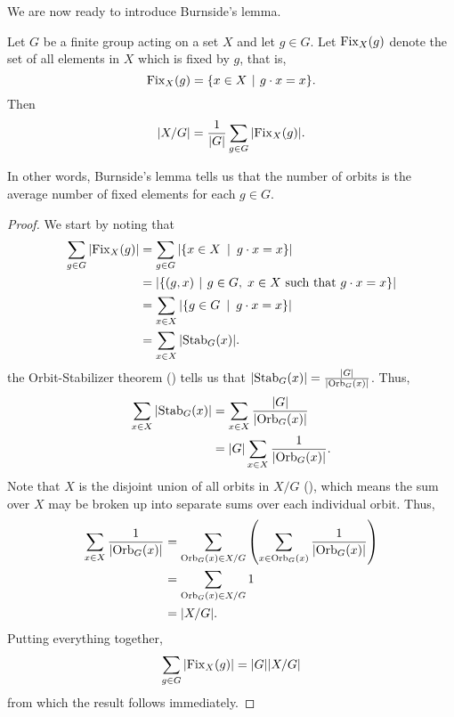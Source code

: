We are now ready to introduce Burnside's lemma.
\begin{lemma}[Burnside]\label{lemma-burnside}
    Let $G$ be a finite group acting on a set $X$ and let $g \in G$. Let $\mathrm{Fix}_{X}(g)$ denote the set of all elements in $X$ which is fixed by $g$, that is,
    \[
        \Fix{X}{g} = \{x \in X \vert g\cdot x = x\}.
    \]
    Then
    \[
        |X/G| = \frac{1}{|G|}\sum_{g\in G} |\mathrm{Fix}_{X}(g)|.
    \]
\end{lemma}
In other words, Burnside's lemma tells us that the number of orbits is the average number of fixed elements for each $g \in G$.
\begin{proof}
    We start by noting that
    \begin{align*}
        \sum_{g\in G} |\Fix{X}{g}| &= \sum_{g\in G} |\{x \in X \vertalt g\cdot x = x\}|\\
        &= |\{(g, x) \vert g \in G,\; x \in X \text{ such that } g\cdot x = x\}|\\
        &= \sum_{x\in X} |\{g \in G \vertalt g\cdot x = x\}|\\
        &= \sum_{x\in X} |\Stab{G}{x}|.
    \end{align*}
    the Orbit-Stabilizer theorem () tells us that $|\mathrm{Stab}_{G}(x)| = \frac{|G|}{|\mathrm{Orb}_{G}(x)|}$. Thus,
    \begin{align*}
        \sum_{x\in X} |\mathrm{Stab}_{G}(x)| &= \sum_{x\in X} \frac{|G|}{|\mathrm{Orb}_{G}(x)|}\\
        &= |G|\sum_{x\in X} \frac{1}{|\mathrm{Orb}_{G}(x)|}.
    \end{align*}
    Note that $X$ is the disjoint union of all orbits in $X/G$ (), which means the sum over $X$ may be broken up into separate sums over each individual orbit. Thus,
    \begin{align*}
        \sum_{x\in X} \frac{1}{|\mathrm{Orb}_{G}(x)|} &= \sum_{\mathrm{Orb}_{G}(x) \in X/G}\left(\sum_{x \in \mathrm{Orb}_{G}(x)} \frac{1}{|\mathrm{Orb}_{G}(x)|}\right)\\
        &= \sum_{\mathrm{Orb}_{G}(x) \in X/G} 1\\
        &= |X/G|.
    \end{align*}
    Putting everything together,
    \[
        \sum_{g\in G} |\mathrm{Fix}_{X}(g)| = |G||X/G|
    \]
    from which the result follows immediately.
\end{proof}

